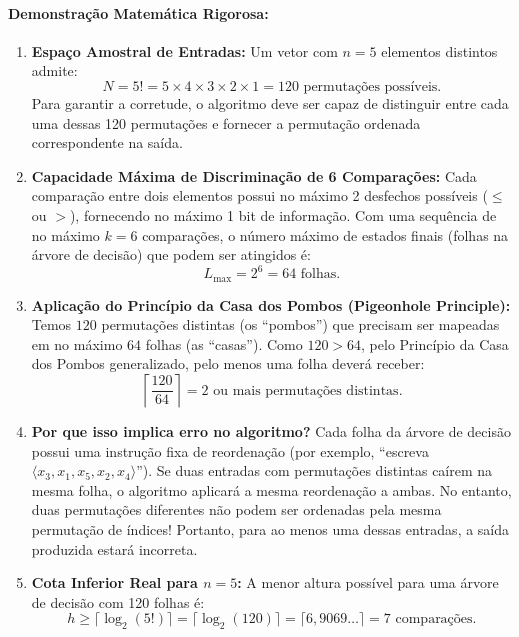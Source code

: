 \documentclass[11pt,a4paper]{article}
\begin{document}
\paragraph{Demonstração Matemática Rigorosa:}
\begin{enumerate}
    \item \textbf{Espaço Amostral de Entradas:}
    Um vetor com $n = 5$ elementos distintos admite:
    \[
        N = 5! = 5 \times 4 \times 3 \times 2 \times 1 = 120 \text{ permutações possíveis}.
    \]
    Para garantir a corretude, o algoritmo deve ser capaz de distinguir entre cada uma dessas 120 permutações e fornecer a permutação ordenada correspondente na saída.

    \item \textbf{Capacidade Máxima de Discriminação de 6 Comparações:}
    Cada comparação entre dois elementos possui no máximo 2 desfechos possíveis ($\le$ ou $>$), fornecendo no máximo 1 bit de informação.
    Com uma sequência de no máximo $k = 6$ comparações, o número máximo de estados finais (folhas na árvore de decisão) que podem ser atingidos é:
    \[
        L_{\max} = 2^6 = 64 \text{ folhas}.
    \]

    \item \textbf{Aplicação do Princípio da Casa dos Pombos (Pigeonhole Principle):}
    Temos $120$ permutações distintas (os ``pombos'') que precisam ser mapeadas em no máximo $64$ folhas (as ``casas'').
    Como $120 > 64$, pelo Princípio da Casa dos Pombos generalizado, pelo menos uma folha deverá receber:
    \[
        \left\lceil \frac{120}{64} \right\rceil = 2 \text{ ou mais permutações distintas}.
    \]
    
    \item \textbf{Por que isso implica erro no algoritmo?}
    Cada folha da árvore de decisão possui uma instrução fixa de reordenação (por exemplo, ``escreva $\langle x_3, x_1, x_5, x_2, x_4 \rangle$''). Se duas entradas com permutações distintas caírem na mesma folha, o algoritmo aplicará a mesma reordenação a ambas. No entanto, duas permutações diferentes não podem ser ordenadas pela mesma permutação de índices! Portanto, para ao menos uma dessas entradas, a saída produzida estará incorreta.

    \item \textbf{Cota Inferior Real para $n = 5$:}
    A menor altura possível para uma árvore de decisão com 120 folhas é:
    \[
        h \ge \lceil \log_2(5!) \rceil = \lceil \log_2(120) \rceil = \lceil 6{,}9069 \dots \rceil = 7 \text{ comparações}.
    \]
\end{enumerate}
\end{document}
